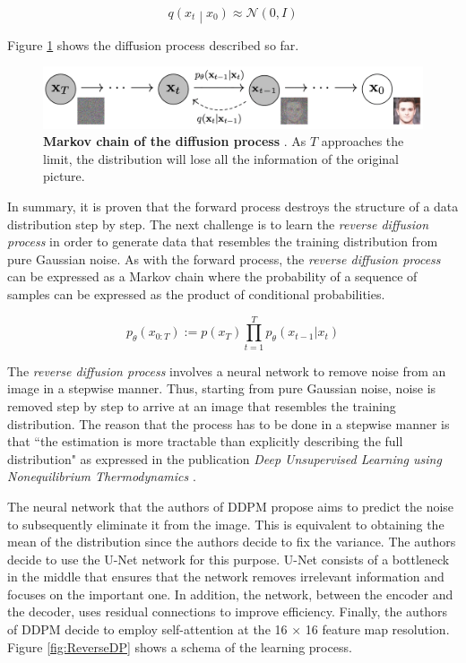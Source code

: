 \[q\left(x_t\middle| x_0\right)\approx\mathcal{N}\left(0,I\right)\]

Figure \ref{fig:MarkovchainDP} shows the diffusion process described so far.

\begin{figure}
    \centering
    \includegraphics[width=1\textwidth]{Pictures/MarkovchainDP} 
    \caption{\textbf{Markov chain of the diffusion process} \cite{ho2020denoising}. As $T$ approaches the limit, the distribution will lose all the information of the original picture.}
    \label{fig:MarkovchainDP}
\end{figure}

In summary, it is proven that the forward process destroys the structure of a data distribution step by step. The next challenge is to learn the \textit{reverse diffusion process} in order to generate data that resembles the training distribution from pure Gaussian noise. As with the forward process, the \textit{reverse diffusion process} can be expressed as a Markov chain where the probability of a sequence of samples can be expressed as the product of conditional probabilities.

\[ p_\theta\left(x_{0:T}\right) := p\left ( x_T \right ) \prod_{t=1}^{T}p_\theta\left ( x_{t-1} | x_t\right ) \]

The \textit{reverse diffusion process} involves a neural network to remove noise from an image in a stepwise manner. Thus, starting from pure Gaussian noise, noise is removed step by step to arrive at an image that resembles the training distribution. The reason that the process has to be done in a stepwise manner is that ``the estimation is more tractable than explicitly describing the full distribution" as expressed in the publication \textit{Deep Unsupervised Learning using Nonequilibrium Thermodynamics} \cite{sohl2015deep}.

The neural network that the authors of DDPM propose aims to predict the noise to subsequently eliminate it from the image. This is equivalent to obtaining the mean of the distribution since the authors decide to fix the variance. The authors decide to use the U-Net network \cite{ronneberger2015u} for this purpose. U-Net consists of a bottleneck in the middle that ensures that the network removes irrelevant information and focuses on the important one. In addition, the network, between the encoder and the decoder, uses residual connections to improve efficiency. Finally, the authors of DDPM decide to employ self-attention at the 16 × 16 feature map resolution. Figure \ref{fig:ReverseDP} shows a schema of the learning process.

